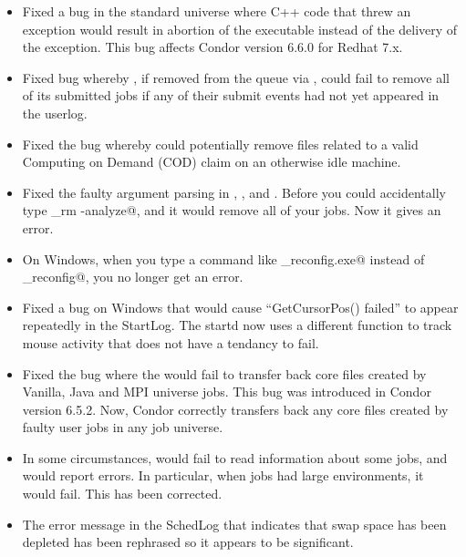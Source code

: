 \begin{itemize}

\item Fixed a bug in the standard universe where C++ code that threw an 
exception would result in abortion of the executable instead of the delivery
of the exception. 
This bug affects Condor version 6.6.0 for Redhat 7.x.

\item Fixed bug whereby , if removed from the queue via
      , could fail to remove all of its submitted jobs if
      any of their submit events had not yet appeared in the userlog.

\item Fixed the bug whereby  could potentially remove
  files related to a valid Computing on Demand (COD) claim on an
  otherwise idle machine.

\item Fixed the faulty argument parsing in ,
  , and .
  Before you could accidentally type \verb@condor_rm -analyze@, and it
  would remove all of your jobs.
  Now it gives an error.

\item On Windows, when you type a command like
  \verb@condor_reconfig.exe@ instead of \verb@condor_reconfig@, you no
  longer get an error.

\item Fixed a bug on Windows that would cause ``GetCursorPos() failed''
to appear repeatedly in the StartLog. The startd now uses a different
function to track mouse activity that does not have a tendancy to fail.

\item Fixed the bug where the  would fail to transfer
  back core files created by Vanilla, Java and MPI universe jobs.
  This bug was introduced in Condor version 6.5.2.
  Now, Condor correctly transfers back any core files created by
  faulty user jobs in any job universe.

\item In some circumstances,  would fail to read
  information about some jobs, and would report errors. In particular,
  when jobs had large environments, it would fail. This has been
  corrected.

\item The error message in the SchedLog that indicates that swap space
  has been depleted has been rephrased so it appears to be
  significant. 


\end{itemize}
